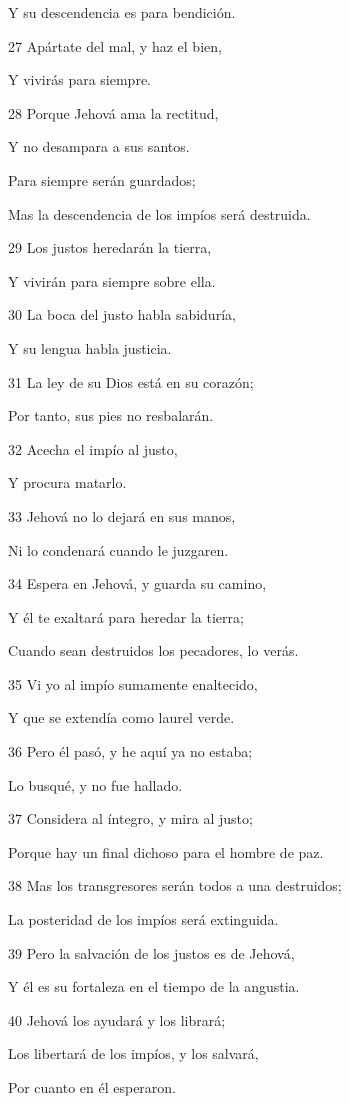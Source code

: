 \par Y su descendencia es para bendición.
\par 27 Apártate del mal, y haz el bien,
\par Y vivirás para siempre.
\par 28 Porque Jehová ama la rectitud,
\par Y no desampara a sus santos.
\par Para siempre serán guardados;
\par Mas la descendencia de los impíos será destruida.
\par 29 Los justos heredarán la tierra,
\par Y vivirán para siempre sobre ella.
\par 30 La boca del justo habla sabiduría,
\par Y su lengua habla justicia.
\par 31 La ley de su Dios está en su corazón;
\par Por tanto, sus pies no resbalarán.
\par 32 Acecha el impío al justo,
\par Y procura matarlo.
\par 33 Jehová no lo dejará en sus manos,
\par Ni lo condenará cuando le juzgaren.
\par 34 Espera en Jehová, y guarda su camino,
\par Y él te exaltará para heredar la tierra;
\par Cuando sean destruidos los pecadores, lo verás.
\par 35 Vi yo al impío sumamente enaltecido,
\par Y que se extendía como laurel verde.
\par 36 Pero él pasó, y he aquí ya no estaba;
\par Lo busqué, y no fue hallado.
\par 37 Considera al íntegro, y mira al justo;
\par Porque hay un final dichoso para el hombre de paz.
\par 38 Mas los transgresores serán todos a una destruidos;
\par La posteridad de los impíos será extinguida.
\par 39 Pero la salvación de los justos es de Jehová,
\par Y él es su fortaleza en el tiempo de la angustia.
\par 40 Jehová los ayudará y los librará;
\par Los libertará de los impíos, y los salvará,
\par Por cuanto en él esperaron.

